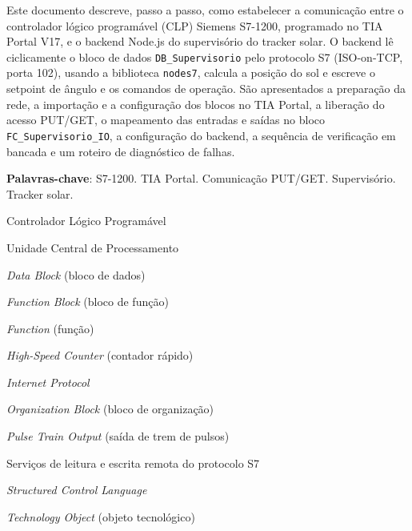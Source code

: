 \documentclass[12pt, oneside, a4paper, chapter=TITLE, section=TITLE, english, brazil]{abntex2}
\renewcommand{\lstlistlistingname}{Lista de códigos}
\begin{document}
\frenchspacing

\imprimircapa
\imprimirfolhaderosto

\begin{resumo}
Este documento descreve, passo a passo, como estabelecer a comunicação entre o controlador lógico programável (CLP) Siemens S7-1200, programado no TIA Portal V17, e o backend Node.js do supervisório do tracker solar. O backend lê ciclicamente o bloco de dados \texttt{DB\_Supervisorio} pelo protocolo S7 (ISO-on-TCP, porta 102), usando a biblioteca \texttt{nodes7}, calcula a posição do sol e escreve o setpoint de ângulo e os comandos de operação. São apresentados a preparação da rede, a importação e a configuração dos blocos no TIA Portal, a liberação do acesso PUT/GET, o mapeamento das entradas e saídas no bloco \texttt{FC\_Supervisorio\_IO}, a configuração do backend, a sequência de verificação em bancada e um roteiro de diagnóstico de falhas.

\textbf{Palavras-chave}: S7-1200. TIA Portal. Comunicação PUT/GET. Supervisório. Tracker solar.
\end{resumo}

\listoftables*
\cleardoublepage

\pdfbookmark[0]{\lstlistlistingname}{lol}
\lstlistoflistings
\cleardoublepage

\begin{siglas}
  \item[CLP] Controlador Lógico Programável
  \item[CPU] Unidade Central de Processamento
  \item[DB] \textit{Data Block} (bloco de dados)
  \item[FB] \textit{Function Block} (bloco de função)
  \item[FC] \textit{Function} (função)
  \item[HSC] \textit{High-Speed Counter} (contador rápido)
  \item[IP] \textit{Internet Protocol}
  \item[OB] \textit{Organization Block} (bloco de organização)
  \item[PTO] \textit{Pulse Train Output} (saída de trem de pulsos)
  \item[PUT/GET] Serviços de leitura e escrita remota do protocolo S7
  \item[SCL] \textit{Structured Control Language}
  \item[TO] \textit{Technology Object} (objeto tecnológico)
\end{siglas}
\end{document}
